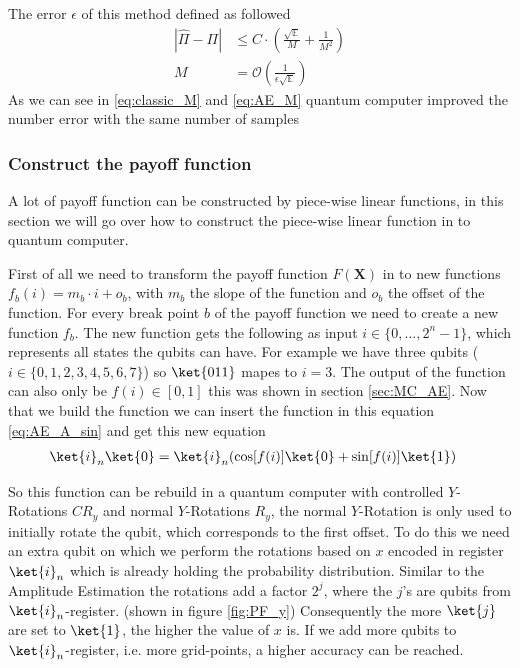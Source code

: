\documentclass[a4paper, 12pt, one column, aas_macros]{article}
\begin{document}
The error $\epsilon$ of this method defined as followed
\begin{align}
    |\hat{\Pi} - \Pi| &\leq C\cdot(\frac{\sqrt{\mathbb{E}}}{M} + \frac{1}{M^2}) \nonumber \\
    M &= \mathcal{O}(\frac{1}{\epsilon \sqrt{\mathbb{E}}}) \label{eq:AE_M}
\end{align}
As we can see in \ref{eq:classic_M} and \ref{eq:AE_M} quantum computer improved the number error with the same number of samples
\subsubsection{Construct the payoff function}\label{sec:MC_Payoff}
A lot of payoff function can be constructed by piece-wise linear functions, in this section we will go over how to construct the piece-wise linear function in to quantum computer.

First of all we need to transform the payoff function $F(\textbf{X})$ in to new functions $f_b(i)=m_b\cdot i + o_b$, with $m_b$ the slope of the function and $o_b$ the offset of the function. For every break point $b$ of the payoff function we need to create a new function $f_b$. The new function gets the following as input $i\in\{0,\ldots, 2^n-1\}$, which represents all states the qubits can have. For example we have three qubits ($i\in\{0,1,2,3,4,5,6,7\}$) so $\ket{011}$ mapes to $i=3$. The output of the function can also only be $f(i)\in[0,1]$ this was shown in section \ref{sec:MC_AE}. Now that we build the function we can insert the function in this equation \ref{eq:AE_A_sin} and get this new equation
\begin{align}
    \ket{i}_n\ket{0} &= \ket{i}_n(\cos[f(i)]\ket{0}+\sin[f(i)]\ket{1}) \label{eq:PF_f}
\end{align}

So this function can be rebuild in a quantum computer with controlled $Y$-Rotations $CR_y$ and normal $Y$-Rotations $R_y$, the normal $Y$-Rotation is only used to initially rotate the qubit, which corresponds to the first offset. To do this we need an extra qubit on which we perform the rotations based on $x$ encoded in register $\ket{i}_n$ which is already holding the probability distribution. Similar to the Amplitude Estimation the rotations add a factor $2^{j}$, where the ${j}$'s are qubits from $\ket{i}_n$-register. (shown in figure \ref{fig:PF_y}) Consequently the more $\ket{j}$ are set to $\ket{1}$, the higher the value of $x$ is. If we add more qubits to $\ket{i}_n$-register, i.e. more grid-points, a higher accuracy can be reached.
\end{document}
